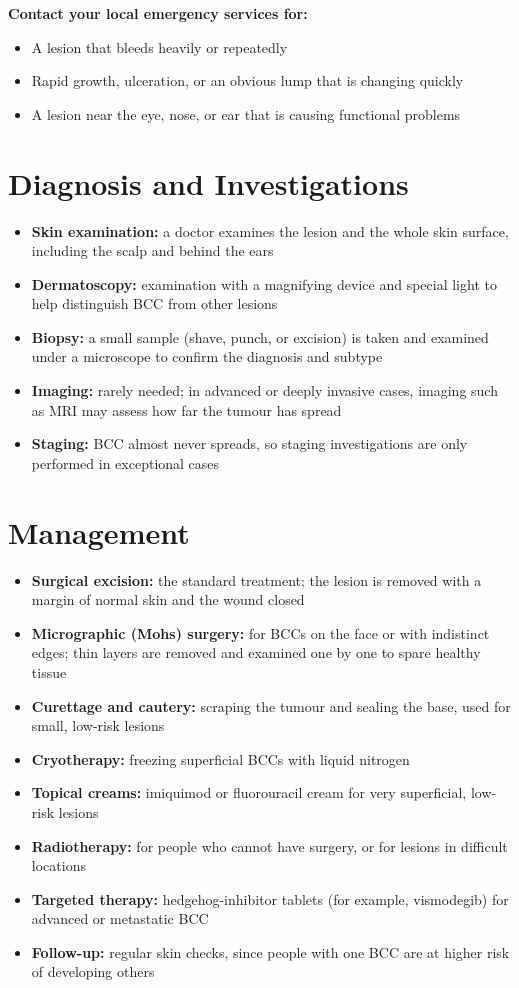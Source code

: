 \textbf{Contact your local emergency services for:}
\begin{itemize}
    \item A lesion that bleeds heavily or repeatedly
    \item Rapid growth, ulceration, or an obvious lump that is changing quickly
    \item A lesion near the eye, nose, or ear that is causing functional problems
\end{itemize}

\section*{Diagnosis and Investigations}
\begin{itemize}
    \item \textbf{Skin examination:} a doctor examines the lesion and the whole skin surface, including the scalp and behind the ears
    \item \textbf{Dermatoscopy:} examination with a magnifying device and special light to help distinguish BCC from other lesions
    \item \textbf{Biopsy:} a small sample (shave, punch, or excision) is taken and examined under a microscope to confirm the diagnosis and subtype
    \item \textbf{Imaging:} rarely needed; in advanced or deeply invasive cases, imaging such as MRI may assess how far the tumour has spread
    \item \textbf{Staging:} BCC almost never spreads, so staging investigations are only performed in exceptional cases
\end{itemize}

\section*{Management}
\begin{itemize}
    \item \textbf{Surgical excision:} the standard treatment; the lesion is removed with a margin of normal skin and the wound closed
    \item \textbf{Micrographic (Mohs) surgery:} for BCCs on the face or with indistinct edges; thin layers are removed and examined one by one to spare healthy tissue
    \item \textbf{Curettage and cautery:} scraping the tumour and sealing the base, used for small, low-risk lesions
    \item \textbf{Cryotherapy:} freezing superficial BCCs with liquid nitrogen
    \item \textbf{Topical creams:} imiquimod or fluorouracil cream for very superficial, low-risk lesions
    \item \textbf{Radiotherapy:} for people who cannot have surgery, or for lesions in difficult locations
    \item \textbf{Targeted therapy:} hedgehog-inhibitor tablets (for example, vismodegib) for advanced or metastatic BCC
    \item \textbf{Follow-up:} regular skin checks, since people with one BCC are at higher risk of developing others
\end{itemize}

